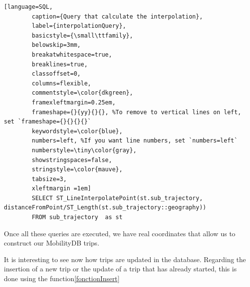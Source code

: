 \documentclass[12pt]{report}
\begin{document}
	\begin{lstlisting}[language=SQL,
		caption={Query that calculate the interpolation},
		label={interpolationQuery},
		basicstyle={\small\ttfamily},
		belowskip=3mm,
		breakatwhitespace=true,
		breaklines=true,
		classoffset=0,
		columns=flexible,
		commentstyle=\color{dkgreen},
		framexleftmargin=0.25em,
		frameshape={}{yy}{}{}, %To remove to vertical lines on left, set `frameshape={}{}{}{}`
		keywordstyle=\color{blue},
		numbers=left, %If you want line numbers, set `numbers=left`
		numberstyle=\tiny\color{gray},
		showstringspaces=false,
		stringstyle=\color{mauve},
		tabsize=3,
		xleftmargin =1em]
		SELECT ST_LineInterpolatePoint(st.sub_trajectory, distanceFromPoint/ST_Length(st.sub_trajectory::geography))
		FROM sub_trajectory  as st
	\end{lstlisting}
	
	
	Once all these queries are executed, we have real coordinates that allow us to construct our MobilityDB trips.
	
	It is interesting to see now how trips are updated in the database. Regarding the insertion of a new trip or the update of a trip that has already started, this is done using the function\ref{fonctionInsert}
	
\end{document}
